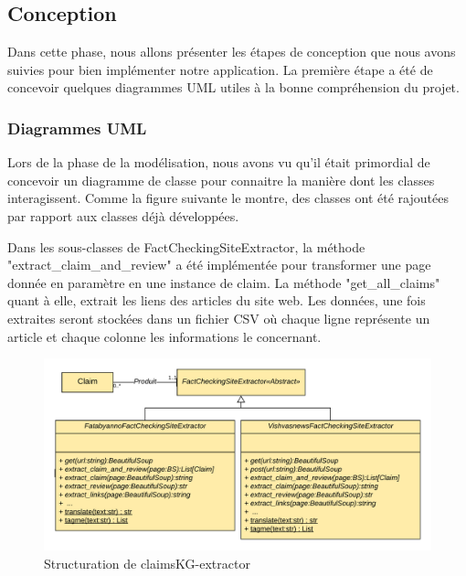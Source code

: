 \documentclass[oneside,13pt,a4paper]{report}
\begin{document}
\subsection{Conception}

Dans cette phase, nous allons présenter les étapes de conception que nous avons suivies pour bien implémenter notre application. La première étape a été de concevoir quelques diagrammes UML utiles à la bonne compréhension du projet.

\subsubsection{Diagrammes UML}

Lors de la phase de la modélisation, nous avons vu qu'il était primordial de concevoir un diagramme de classe pour connaitre la manière dont les classes interagissent. Comme la figure suivante le montre, des classes ont été rajoutées par rapport aux classes déjà développées.

Dans les sous-classes de FactCheckingSiteExtractor, la méthode "extract\_claim\_and\_review" a été implémentée pour transformer une page donnée en paramètre en une instance de claim. La méthode  "get\_all\_claims" quant à elle, extrait les liens des articles du site web. Les données, une fois extraites seront stockées dans un fichier CSV où chaque ligne représente un article et chaque colonne les informations le concernant.

\begin{figure}[h]
	\centering
	\begin{minipage}[c]{.8\linewidth}
		\includegraphics[width=1\textwidth]{img/notre-extracteur.png}
		\caption{Structuration de claimsKG-extractor}
	\end{minipage}
\end{figure}
\end{document}
